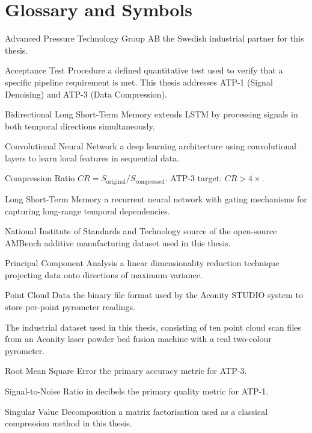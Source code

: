 \chapter*{Glossary and Symbols}

\begin{description}[leftmargin=3cm, style=nextline]
\item[AP\&T]       Advanced Pressure Technology Group AB  the Swedish industrial partner for this thesis.
\item[ATP]         Acceptance Test Procedure a defined quantitative test used to verify that a specific pipeline requirement is met. This thesis addresses ATP-1 (Signal Denoising) and ATP-3 (Data Compression).
\item[BiLSTM]      Bidirectional Long Short-Term Memory extends LSTM by processing signals in both temporal directions simultaneously.
\item[CNN]         Convolutional Neural Network a deep learning architecture using convolutional layers to learn local features in sequential data.
\item[CR]          Compression Ratio  $CR = S_{\text{original}} / S_{\text{compressed}}$. ATP-3 target: $CR > 4\times$.
\item[LSTM]        Long Short-Term Memory  a recurrent neural network with gating mechanisms for capturing long-range temporal dependencies.
\item[NIST]        National Institute of Standards and Technology source of the open-source AMBench additive manufacturing dataset used in this thesis.
\item[PCA]         Principal Component Analysis  a linear dimensionality reduction technique projecting data onto directions of maximum variance.
\item[PCD]         Point Cloud Data the binary file format used by the Aconity STUDIO system to store per-point pyrometer readings.
\item[PODFAM]      The industrial dataset used in this thesis, consisting of ten point cloud scan files from an Aconity laser powder bed fusion machine with a real two-colour pyrometer.
\item[RMSE]        Root Mean Square Error the primary accuracy metric for ATP-3.
\item[SNR]         Signal-to-Noise Ratio in decibels  the primary quality metric for ATP-1.
\item[SVD]         Singular Value Decomposition a matrix factorisation used as a classical compression method in this thesis.

\end{description}

